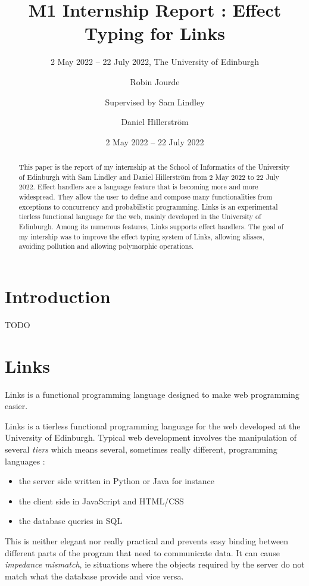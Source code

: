 \documentclass[11pt, nonacm=true, language=french, language=english]{acmart}
\author[R. Jourde]{Robin Jourde}
\affiliation{%
  \institution{École Normale Supérieure de Lyon}%
  \country{France}%
}
\author{Supervised by Sam Lindley}
\author{Daniel Hillerström}
\affiliation{%
  \institution{The University of Edinburgh}%
  \country{United Kingdom}%
}
\title[M1 Intership Report]{M1 Internship Report : Effect Typing for Links}
\subtitle{2 May 2022 -- 22 July 2022, The University of Edinburgh}
\date{2 May 2022 -- 22 July 2022}
\begin{document}
\begin{abstract}
  This paper is the report of my internship at the School of Informatics of the University of Edinburgh with Sam Lindley and Daniel Hillerström from 2 May 2022 to 22 July 2022.
  Effect handlers are a language feature that is becoming more and more widespread. They allow the user to define and compose many functionalities from exceptions to concurrency and probabilistic programming.
  Links is an experimental tierless functional language for the web, mainly developed in the University of Edinburgh. Among its numerous features, Links supports effect handlers.
  The goal of my intership was to improve the effect typing system of Links, allowing aliases, avoiding pollution and allowing polymorphic operations.
\end{abstract}


\maketitle

\tableofcontents

\newpage

\section{Introduction}

TODO

\section{Links}

\begin{fquote}
 Links is a functional programming language designed to make web programming easier.
\end{fquote}

Links \citep{} is a tierless functional programming language for the web developed at the University of Edinburgh. Typical web development involves the manipulation of several \emph{tiers} which means several, sometimes really different, programming languages :
\begin{itemize}
  \item the server side written in Python or Java for instance
  \item the client side in JavaScript and HTML/CSS
  \item the database queries in SQL
\end{itemize}
This is neither elegant nor really practical and prevents easy binding between different parts of the program that need to communicate data. It can cause \emph{impedance mismatch}, ie situations where the objects required by the server do not match what the database provide and vice versa.
\end{document}
